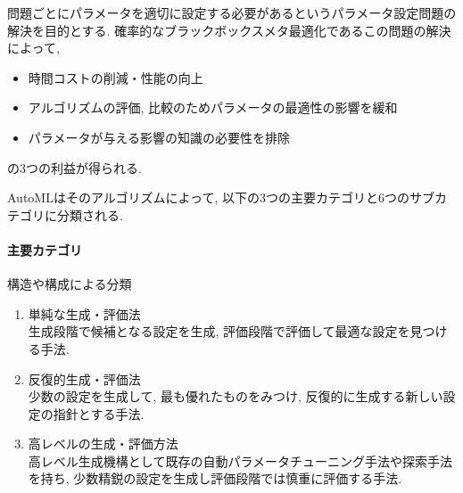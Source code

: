 \documentclass[twocolumn]{jarticle}     %
\begin{document}
問題ごとにパラメータを適切に設定する必要があるというパラメータ設定問題の解決を目的とする.
確率的なブラックボックスメタ最適化であるこの問題の解決によって,
\begin{itemize}
  \item 時間コストの削減・性能の向上
  \item アルゴリズムの評価, 比較のためパラメータの最適性の影響を緩和
  \item パラメータが与える影響の知識の必要性を排除
\end{itemize}
の3つの利益が得られる.

AutoMLはそのアルゴリズムによって, 以下の3つの主要カテゴリと6つのサブカテゴリに分類される\cite{SurveyAutoML}.

\paragraph{主要カテゴリ}
構造や構成による分類
\begin{enumerate}
  \item 単純な生成・評価法 \\
  生成段階で候補となる設定を生成, 評価段階で評価して最適な設定を見つける手法.

  \item 反復的生成・評価法 \\
  少数の設定を生成して, 最も優れたものをみつけ, 反復的に生成する新しい設定の指針とする手法.

  \item 高レベルの生成・評価方法 \\
  高レベル生成機構として既存の自動パラメータチューニング手法や探索手法を持ち,
  少数精鋭の設定を生成し評価段階では慎重に評価する手法.
\end{enumerate}
\end{document}
